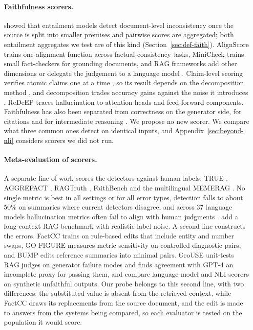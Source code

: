 \paragraph{Faithfulness scorers.}
\citet{laban-etal-2022-summac} showed that entailment models detect document-level inconsistency once the source is split into smaller premises and pairwise scores are aggregated; both entailment aggregates we test are of this kind (Section~\ref{sec:def-faith}). AlignScore \citep{zha-etal-2023} trains one alignment function across factual-consistency tasks, MiniCheck \citep{tang-etal-2024} trains small fact-checkers for grounding documents, and RAG frameworks add other dimensions or delegate the judgement to a language model \citep{es-etal-2024,saad-falcon-etal-2024,tamber-etal-2025,murugaraj-etal-2026}. Claim-level scoring verifies atomic claims one at a time \citep{min-etal-2023-factscore}, so its result depends on the decomposition method \citep{wanner-etal-2024-closer}, and decomposition trades accuracy gains against the noise it introduces \citep{hu-etal-2025-decomposition}. ReDeEP \citep{sun-etal-2025} traces hallucination to attention heads and feed-forward components. Faithfulness has also been separated from correctness on the generator side, for citations \citep{wallat-etal-2025} and for intermediate reasoning \citep{xu-etal-2025}. We propose no new scorer. We compare what three common ones detect on identical inputs, and Appendix~\ref{sec:beyond-nli} considers scorers we did not run.

\paragraph{Meta-evaluation of scorers.}
A separate line of work scores the detectors against human labels: TRUE \citep{honovich-etal-2022}, AGGREFACT \citep{tang-etal-2023}, RAGTruth \citep{niu-etal-2024}, FaithBench \citep{bao-etal-2025} and the multilingual MEMERAG \citep{cruz-blandon-etal-2025-memerag}. No single metric is best in all settings or for all error types, detection falls to about 50\% on summaries where current detectors disagree, and across 37 language models hallucination metrics often fail to align with human judgments \citep{kulkarni-etal-2025-evaluating}. \citet{chen-etal-2026-rethinking-evaluation} add a long-context RAG benchmark with realistic label noise. A second line constructs the errors. FactCC \citep{kryscinski-etal-2020-evaluating} trains on rule-based edits that include entity and number swaps, GO FIGURE \citep{gabriel-etal-2021-go} measures metric sensitivity on controlled diagnostic pairs, and BUMP \citep{ma-etal-2023} edits reference summaries into minimal pairs. GroUSE \citep{muller-etal-2025-grouse} unit-tests RAG judges on generator failure modes and finds agreement with \mbox{GPT-4} an incomplete proxy for passing them, and \citet{jing-etal-2025-scale} compare language-model and NLI scorers on synthetic unfaithful outputs. Our probe belongs to this second line, with two differences: the substituted value is absent from the retrieved context, while FactCC draws its replacements from the source document, and the edit is made to answers from the systems being compared, so each evaluator is tested on the population it would score.

